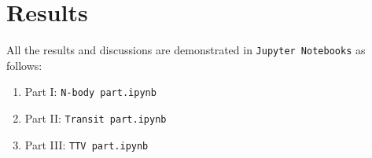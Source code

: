 \documentclass[linenumbers]{aastex631}
\begin{document}
\section{Results} \label{sec:results}
All the results and discussions are demonstrated in \texttt{Jupyter Notebooks} as follows:
\begin{enumerate}
    \item Part I: \texttt{N-body part.ipynb}
    \item Part II: \texttt{Transit part.ipynb}
    \item Part III: \texttt{TTV part.ipynb}
\end{enumerate}

{}



\end{document}
